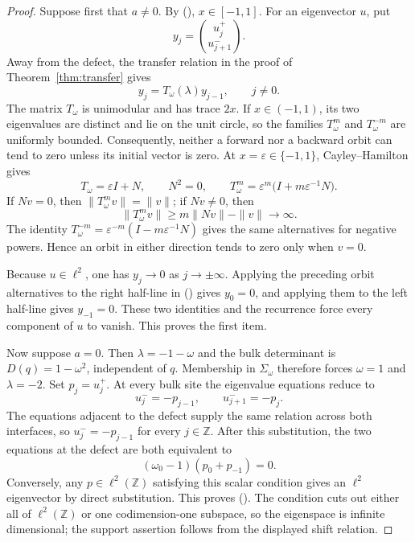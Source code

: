 \documentclass[twoside,10pt]{article}
\numberwithin{equation}{section}
\theoremstyle{slbody}
\theoremstyle{definition}
\theoremstyle{remark}
\newcommand{\Z}{\mathbb Z}
\renewcommand{\eqref}[1]{%
  \textup{{\normalfont(\oldstylenums{\ref{#1}}}\normalfont)}}
\begin{document}
\begin{proof}
Suppose first that $a\ne0$.  By
\eqref{eq:bulk-x-equivalence}, $x\in[-1,1]$.  For an eigenvector $u$, put
\[
 y_j=\binom{u_j^+}{u_{j+1}^-}.
\]
Away from the defect, the transfer relation in the proof of
Theorem~\ref{thm:transfer} gives
\begin{equation}\label{eq:infinite-bulk-transfer}
 y_j=T_\omega(\lambda)y_{j-1},\qquad j\ne0.
\end{equation}
The matrix $T_\omega$ is unimodular and has trace $2x$.  If
$x\in(-1,1)$, its two eigenvalues are distinct and lie on the unit
circle, so the families $T_\omega^m$ and $T_\omega^{-m}$ are uniformly
bounded.  Consequently, neither a forward nor a backward orbit can tend
to zero unless its initial vector is zero.  At
$x=\varepsilon\in\{-1,1\}$, Cayley--Hamilton gives
\[
 T_\omega=\varepsilon I+N,\qquad N^2=0,
 \qquad
 T_\omega^m=\varepsilon^m
   \bigl(I+m\varepsilon^{-1}N\bigr).
\]
If $Nv=0$, then $\|T_\omega^mv\|=\|v\|$; if $Nv\ne0$, then
\[
 \|T_\omega^mv\|\ge m\|Nv\|-\|v\|\longrightarrow\infty.
\]
The identity
$T_\omega^{-m}=\varepsilon^{-m}(I-m\varepsilon^{-1}N)$ gives the same
alternatives for negative powers.  Hence an orbit in either direction
tends to zero only when $v=0$.

Because $u\in\ell^2$, one has $y_j\to0$ as $j\to\pm\infty$.
Applying the preceding orbit alternatives to the right half-line in
\eqref{eq:infinite-bulk-transfer} gives $y_0=0$, and applying them to the
left half-line gives $y_{-1}=0$.  These two identities and the recurrence
force every component of $u$ to vanish.  This proves the first item.

Now suppose $a=0$.  Then $\lambda=-1-\omega$ and the bulk determinant is
$D(q)=1-\omega^2$, independent of $q$.  Membership in
$\Sigma_\omega$ therefore forces $\omega=1$ and $\lambda=-2$.
Set $p_j=u_j^+$.  At every bulk site the eigenvalue equations reduce to
\[
 u_j^-=-p_{j-1},\qquad u_{j+1}^-=-p_j.
\]
The equations adjacent to the defect supply the same relation across both
interfaces, so $u_j^-=-p_{j-1}$ for every $j\in\Z$.  After this
substitution, the two equations at the defect are both equivalent to
\[
 (\omega_0-1)(p_0+p_{-1})=0.
\]
Conversely, any $p\in\ell^2(\Z)$ satisfying this scalar condition gives
an $\ell^2$ eigenvector by direct substitution.  This proves
\eqref{eq:infinite-flat-eigenspace}.  The condition cuts out either all of
$\ell^2(\Z)$ or one codimension-one subspace, so the eigenspace is infinite
dimensional; the support assertion follows from the displayed shift
relation.
\end{proof}
\end{document}
